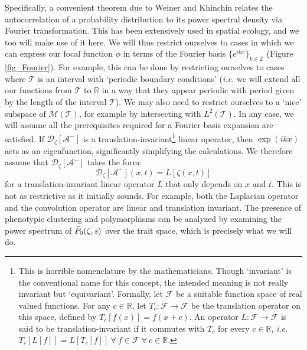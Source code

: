 Specifically, a convenient theorem due to Weiner and Khinchin relates the autocorrelation of a probability distribution to its power spectral density via Fourier transformation. This has been extensively used in spatial ecology, and we too will make use of it here. We will thus restrict ourselves to cases in which we can express our focal function $\phi$ in terms of the Fourier basis $\{e^{ikx}\}_{k\in\mathbb{Z}}$ (Figure \ref{fig_Fourier}). For example, this can be done by restricting ourselves to cases where $\mathcal{T}$ is an interval with `periodic boundary conditions' (\emph{i.e.} we will extend all our functions from $\mathcal{T}$ to $\mathbb{R}$ in a way that they appear periodic with period given by the length of the interval $\mathcal{T}$). We may also need to restrict ourselves to a `nice' subspace of $\mathcal{M}(\mathcal{T})$, for example by intersecting with $L^2(\mathcal{T})$. In any case, we will assume all the prerequisites required for a Fourier basis expansion are satisfied. If $\mathcal{D}_{\zeta}[\mathcal{A}^{-}]$ is a translation-invariant\footnote{This is horrible nomenclature by the mathematicians. Though `invariant' is the conventional name for this concept, the intended meaning is not really invariant but `equivariant'. Formally, let $\mathcal{F}$ be a suitable function space of real valued functions. For any $c \in \mathbb{R}$, let $T_c: \mathcal{F} \to \mathcal{F}$ be the translation operator on this space, defined by $T_c[f(x)] = f(x+c)$. An operator $L: \mathcal{F} \to \mathcal{F}$ is said to be translation-invariant if it commutes with $T_c$ for every $c \in \mathbb{R}$, \emph{i.e.} $T_c[L[f]] = L[T_c[f]] \ \forall \ f \in \mathcal{F} \ \forall \ c \in \mathbb{R}$.} linear operator, then $\exp(ikx)$ acts as an eigenfunction, significantly simplifying the calculations. We therefore assume that $\mathcal{D}_{\zeta}[\mathcal{A}^{-}]$ takes the form:
\begin{equation*}
 \mathcal{D}_{\zeta}[\mathcal{A}^-](x,t) = L[\zeta(x,t)]   
\end{equation*}
for a translation-invariant linear operator $L$ that only depends on $x$ and $t$. This is not as restrictive as it initially sounds. For example, both the Laplacian operator and the convolution operator are linear and translation invariant. The presence of phenotypic clustering and polymorphisms can be analyzed by examining the power spectrum of $\Tilde{P}_{0}(\zeta,s)$ over the trait space, which is precisely what we will do.

